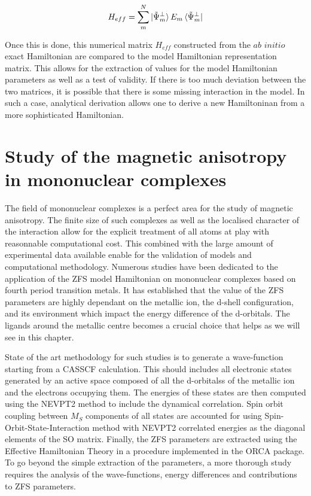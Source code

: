 \documentclass[12pt]{report}
\numberwithin{equation}{section}
\begin{document}
\begin{equation}
    H_{eff}=\sum_{m}^{N}\ket{\tilde{\Psi}_m^{\bot}}E_m \bra{\tilde{\Psi}_m^{\bot}}
\end{equation}

Once this is done, this numerical matrix $H_{eff}$ constructed from the $\textit{ab}$ $\textit{initio}$ exact Hamiltonian are compared to the model Hamiltonian representation matrix. 
This allows for the extraction of values for the model Hamiltonian parameters as well as a test of validity.
If there is too much deviation between the two matrices, it is possible that there is some missing interaction in the model.
In such a case, analytical derivation allows one to derive a new Hamiltoninan from a more sophisticated Hamiltonian.

\chapter{Study of the magnetic anisotropy in mononuclear complexes}

The field of mononuclear complexes is a perfect area for the study of magnetic anisotropy. 
The finite size of such complexes as well as the localised character of the interaction allow for the explicit treatment of all atoms at play with reasonnable computational cost.
This combined with the large amount of experimental data available enable for the validation of models and computational methodology.
Numerous studies have been dedicated to the application of the ZFS model Hamiltonian on mononuclear complexes based on fourth period transition metals.
It has established that the value of the ZFS parameters are highly dependant on the metallic ion, the d-shell configuration, and its environment which impact the energy difference of the d-orbitals.
The ligands around the metallic centre becomes a crucial choice that helps as we will see in this chapter.
\par State of the art methodology for such studies is to generate a wave-function starting from a CASSCF calculation. This should includes all electronic states generated by an active space composed of all the d-orbitalss of the metallic ion and the electrons occupying them. 
The energies of these states are then computed using the NEVPT2 method to include the dynamical correlation.
Spin orbit coupling between $M_S$ components of all states are accounted for using Spin-Orbit-State-Interaction method with NEVPT2 correlated energies as the diagonal elements of the SO matrix.
Finally, the ZFS parameters are extracted using the Effective Hamiltonian Theory in a procedure implemented in the ORCA package.
To go beyond the simple extraction of the parameters, a more thorough study requires the analysis of the wave-functions, energy differences and contributions to ZFS parameters.
\end{document}
